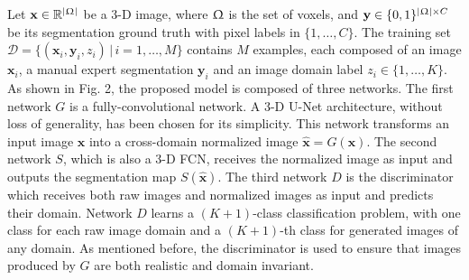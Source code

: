 \documentclass{article}
\renewcommand{\vec}[1]{\mathbf{#1}}
\newcommand{\yy}{\vec{y}}
\newcommand{\xx}{\vec{x}}
\newcommand{\xnorm}{\widehat{\vec{x}}}
\newcommand{\data}{\mathcal{D}}
\newcommand{\real}{\mathbb{R}}
\newcommand{\img}{\Upomega}
\begin{document}
Let $\xx \in \real^{|\img|}$ be a 3-D image, where $\img$ is the set of voxels, and $\yy \in \{0,1\}^{|\img| \times C}$ be its segmentation ground truth with pixel labels in $\{1, \ldots, C\}$. The training set $\data = \{(\xx_i, \yy_i, z_i) \, | \, i = 1, \ldots, M\}$ contains $M$ examples, each composed of an image $\xx_i$, a manual expert segmentation $\yy_i$ and an image domain label $z_i \in \{1, \ldots, K\}$. As shown in Fig. 2, the proposed model is composed of three networks. The first network $G$ is a fully-convolutional network. A 3-D U-Net architecture, without loss of generality, has been chosen for its simplicity. This network transforms an input image $\xx$ into a cross-domain normalized image $\xnorm = G(\xx)$. The second network $S$, which is also a 3-D FCN, receives the normalized image as input and outputs the segmentation map $S(\xnorm)$. The third network $D$ is the discriminator which receives both raw images and normalized images as input and predicts their domain. Network $D$ learns a $(K\!+\!1)$-class classification problem, with one class for each raw image domain and a $(K\!+\!1)$-th class for generated images of any domain. As mentioned before, the discriminator is used to ensure that images produced by $G$ are both realistic and domain invariant.
\end{document}
